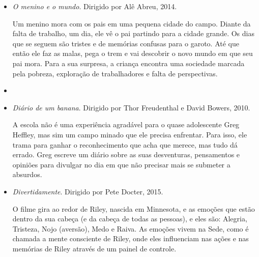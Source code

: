 \documentclass[11pt]{extarticle}
\begin{document}
\begin{itemize}
\item \textit{O menino e o mundo}. Dirigido por Alê Abreu, 2014.

Um menino mora com os pais em uma pequena cidade do campo. Diante da falta de trabalho, um dia, ele vê o pai partindo para a cidade grande. Os dias que se seguem são tristes e de memórias confusas para o garoto. Até que então ele faz as malas, pega o trem e vai descobrir o novo mundo em que seu pai mora. Para a sua surpresa, a criança encontra uma sociedade marcada pela pobreza, exploração de trabalhadores e falta de perspectivas.

\item \item \textit{Diário de um banana}. Dirigido por Thor Freudenthal e David Bowers, 2010. 

A escola não é uma experiência agradável para o quase adolescente Greg Heffley, mas sim um campo minado que ele precisa enfrentar. Para isso, ele trama para ganhar o reconhecimento que acha que merece, mas tudo dá errado. Greg escreve um diário sobre as suas desventuras, pensamentos e opiniões para divulgar no dia em que não precisar mais se submeter a absurdos.

\item \textit{Divertidamente}. Dirigido por Pete Docter, 2015.

O filme gira ao redor de Riley, nascida em Minnesota, e as emoções que estão dentro da sua cabeça (e da cabeça de todas as pessoas), e eles são: Alegria, Tristeza, Nojo (aversão), Medo e Raiva. As emoções vivem na Sede, como é chamada a mente consciente de Riley, onde eles influenciam nas ações e nas memórias de Riley através de um painel de controle.

\end{itemize}
\end{document}
